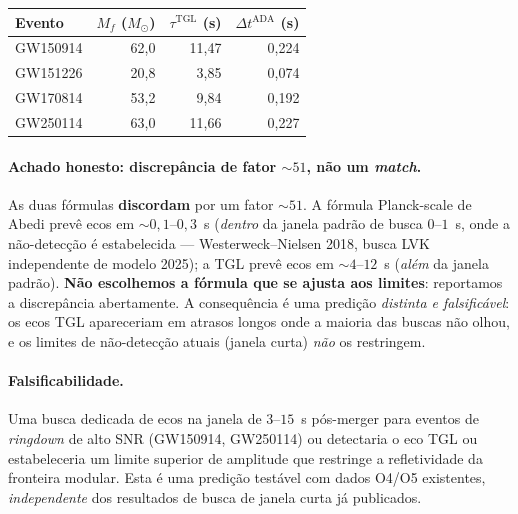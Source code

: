 \documentclass[12pt,a4paper]{article}
\newcommand{\TGL}{\textsc{TGL}}
\begin{document}
\begin{center}
\begin{tabular}{l r r r}
\toprule
\textbf{Evento} & \textbf{$M_f$ ($M_\odot$)} & \textbf{$\tau^{\text{TGL}}$ (s)} & \textbf{$\Delta t^{\text{ADA}}$ (s)} \\
\midrule
GW150914 & 62{,}0 & 11{,}47 & 0{,}224 \\
GW151226 & 20{,}8 & 3{,}85 & 0{,}074 \\
GW170814 & 53{,}2 & 9{,}84 & 0{,}192 \\
GW250114 & 63{,}0 & 11{,}66 & 0{,}227 \\
\bottomrule
\end{tabular}
\end{center}

\paragraph{Achado honesto: discrepância de fator $\sim 51$, não um \emph{match}.}
As duas fórmulas \textbf{discordam} por um fator $\sim 51$.  A
fórmula Planck-scale de Abedi prevê ecos em $\sim 0{,}1$--$0{,}3$~s (\emph{dentro}
da janela padrão de busca $0$--$1$~s, onde a não-detecção é estabelecida ---
Westerweck--Nielsen 2018, busca LVK independente de modelo 2025); a \TGL{} prevê
ecos em $\sim 4$--$12$~s (\emph{além} da janela padrão).  \textbf{Não escolhemos
a fórmula que se ajusta aos limites}: reportamos a discrepância abertamente.  A
consequência é uma predição \emph{distinta e falsificável}: os ecos \TGL{}
apareceriam em atrasos longos onde a maioria das buscas não olhou, e os limites
de não-detecção atuais (janela curta) \emph{não} os restringem.

\paragraph{Falsificabilidade.}
Uma busca dedicada de ecos na janela de $3$--$15$~s pós-merger para eventos de
\emph{ringdown} de alto SNR (GW150914, GW250114) ou detectaria o eco \TGL{} ou
estabeleceria um limite superior de amplitude que restringe a refletividade da
fronteira modular.  Esta é uma predição testável com dados O4/O5 existentes,
\emph{independente} dos resultados de busca de janela curta já publicados.
\end{document}
